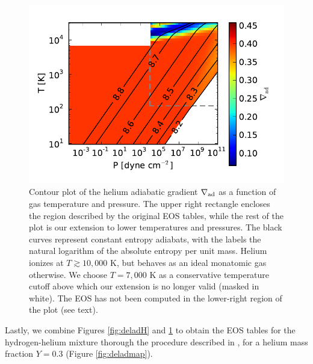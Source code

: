 \documentclass[apj]{emulateapj}
\newcommand{\delad}{\nabla_{\rm ad}}
\begin{document}
\begin{figure}[h!]
\centering
\includegraphics[scale=.8]{../../figs/ModelAtmospheres/RadSelfGravRealEOS/PaperFigs/delad_S_He.pdf}
\caption{Contour plot of the helium adiabatic gradient $\delad$ as a function of gas temperature and pressure. The upper right rectangle encloses the region described by the original \citet{saumon95} EOS tables, while the rest of the plot is our extension to lower temperatures and pressures. The black curves represent constant entropy adiabats, with the labels the natural logarithm of the absolute entropy per unit mass. Helium ionizes at $T \gtrsim 10,000$ K, but behaves as an ideal monatomic gas otherwise. We choose $T=7,000$ K as a conservative temperature cutoff above which our extension is no longer valid (masked in white). The EOS has not been computed in the lower-right region of the plot (see text).}
\label{fig:deladHe}
\end{figure}

\vspace{0.2in}

Lastly, we combine Figures \ref{fig:deladH} and \ref{fig:deladHe} to obtain the EOS tables for the hydrogen-helium mixture thorough the procedure described in \citet{saumon95}, for a helium mass fraction $Y=0.3$ (Figure \ref{fig:deladmap}).

\end{document}
